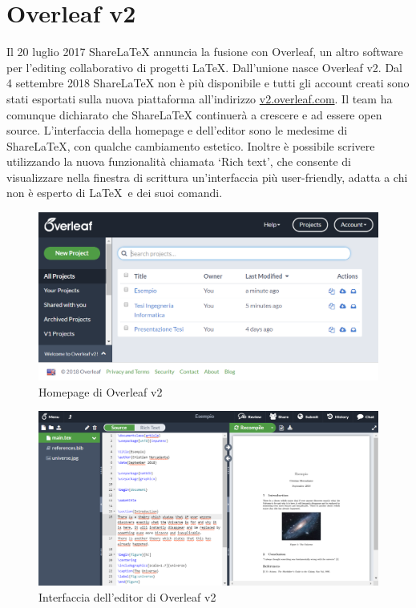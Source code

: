 \section{Overleaf v2}
Il 20 luglio 2017 ShareLaTeX annuncia la fusione con Overleaf, un altro software per l'editing collaborativo di progetti \LaTeX. Dall'unione nasce Overleaf v2. Dal 4 settembre 2018 ShareLaTeX non è più disponibile e tutti gli account creati sono stati esportati sulla nuova piattaforma all'indirizzo \url{v2.overleaf.com}. Il team ha comunque dichiarato che ShareLaTeX continuerà a crescere e ad essere open source. L'interfaccia della homepage e dell'editor sono le medesime di ShareLaTeX, con qualche cambiamento estetico. Inoltre è possibile scrivere utilizzando la nuova funzionalità chiamata \enquote*{Rich text}, che consente di visualizzare nella finestra di scrittura un'interfaccia più user-friendly, adatta a chi non è esperto di \LaTeX ~e dei suoi comandi.
\begin{figure}[h]
    \centering
    \includegraphics[width=\textwidth]{immagini/overleaf_homepage.PNG}
    \caption{Homepage di Overleaf v2}
    \label{fig:overleaf_homepage}
\end{figure}
\begin{figure}[h]
    \centering
    \includegraphics[width=\textwidth]{immagini/overleaf_editor.PNG}
    \caption{Interfaccia dell'editor di Overleaf v2}
    \label{fig:overleaf_editor}
\end{figure}

